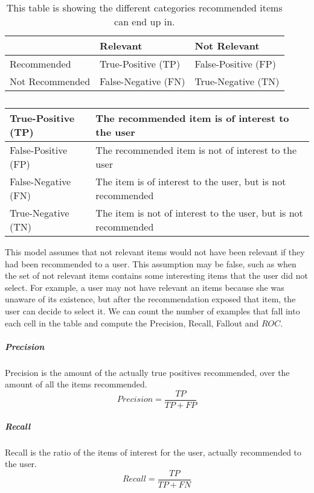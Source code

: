 \begin{table}[H]
	\centering
	\begin{tabular}{l|l|l}
					&	Relevant			&	Not Relevant \\ \hline
	Recommended		&	True-Positive (TP) 	&	False-Positive (FP)	\\ \hline
	Not Recommended	&	False-Negative (FN)	&	True-Negative (TN)	\\ \hline
	\end{tabular}
	\label{table:usageprediction}
	\caption[Usage prediction (Confusion Matrix)]{This table is showing the different categories recommended items can end up in.}
\end{table}

\begin{table}[H]
	\centering
	\begin{tabular}{l|l}
		True-Positive (TP)	& The recommended item is of interest to the user \\ \hline
		False-Positive (FP)	& The recommended item is not of interest to the user \\ \hline
		False-Negative (FN)	& The item is of interest to the user, but is not recommended \\ \hline
		True-Negative (TN)	& The item is not of interest to the user, but is not recommended \\
	\end{tabular}
	\label{table:predictionCategories}
	\caption[Prediction Categories]{}
\end{table}

This model assumes that not relevant items would not have been relevant if they had been
recommended to a user. This assumption may be false, such as when the set of
not relevant items contains some interesting items that the user did not select. For
example, a user may not have relevant an items because she was unaware of its
existence, but after the recommendation exposed that item, the user can decide
to select it. We can count the number of examples that fall into each cell in
the table and compute the Precision, Recall, Fallout and $ROC$.

\subparagraph{Precision}
Precision is the amount of the actually true positives recommended, over the amount of all the items recommended.
\begin{equation}
    Precision = \frac{TP}{TP+FP}
    \label{equation:precision}
\end{equation}

\subparagraph{Recall}
Recall is the ratio of the items of interest for the user, actually recommended to the user.
\begin{equation}
    Recall = \frac{TP}{TP+FN}
    \label{equation:recall}
\end{equation}

